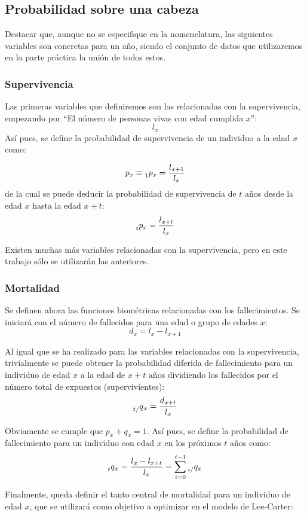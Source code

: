 \documentclass{article}
\begin{document}
\subsection{Probabilidad sobre una cabeza}
Destacar que, aunque no se especifique en la nomenclatura, las siguientes variables son concretas para un año, siendo el conjunto de datos que utilizaremos en la parte práctica la unión de todos estos.

\subsubsection*{Supervivencia}
Las primeras variables que definiremos son las relacionadas con la supervivencia, empezando por ``El número de personas vivas con edad cumplida $x$'':
$$
l_{x}
$$
Así pues, se define la probabilidad de supervivencia de un individuo a la edad $x$ como:

$$
p_{x}\equiv \prescript{}{1}p_{x}=\frac{l_{x+1}}{l_{x}}
$$
de la cual se puede deducir la probabilidad de supervivencia de $t$ años desde la edad $x$ hasta la edad $x+t$:
$$
\prescript{}{t}p_{x}=\frac{l_{x+t}}{l_{x}}
$$

Existen muchas más variables relacionadas con la supervivencia, pero en este trabajo sólo se utilizarán las anteriores.
\subsubsection*{Mortalidad}

Se definen ahora las funciones biométricas relacionadas con los fallecimientos. Se iniciará con el número de fallecidos para una edad o grupo de edades $x$:
$$
d_{x}=l_{x}-l_{x+1}
$$

Al igual que se ha realizado para las variables relacionadas con la supervivencia, trivialmente se puede obtener la probabilidad diferida de fallecimiento para un individuo de edad $x$ a la edad de $x+t$ años dividiendo los fallecidos por el número total de expuestos (supervivientes):
$$
\prescript{}{t/}q_{x}=\frac{d_{x+t}}{l_{x}}$$

Obviamente se cumple que $p_{x}+q_{x}=1$. Así pues, se define la probabilidad de fallecimiento para un individuo con edad $x$ en los próximos $t$ años como:
$$
\prescript{}{t}q_{x}=\frac{l_{x}-l_{x+t}}{l_{x}}=\sum_{i=0}^{t-1}\prescript{}{i/}q_{x}
$$

Finalmente, queda definir el tanto central de mortalidad para un individuo de edad $x$, que se utilizará como objetivo a optimizar en el modelo de Lee-Carter:
\end{document}
